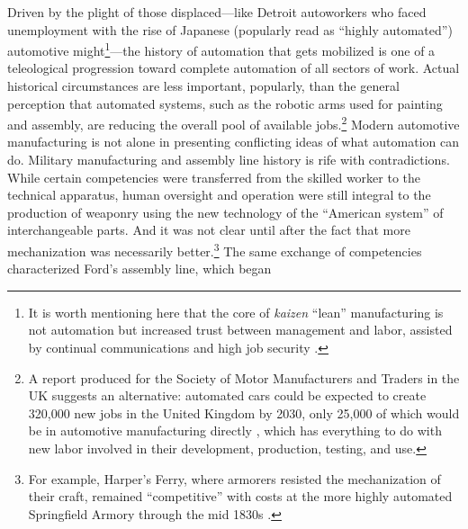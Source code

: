 


Driven by the plight of those displaced---like Detroit
autoworkers who faced unemployment with the rise of
Japanese (popularly read as ``highly automated'') automotive
might\footnote{It is worth mentioning here that the core of
  \emph{kaizen} ``lean'' manufacturing is not automation but increased trust between management
  and labor, assisted by continual communications and high job
  security \cite[p. 198--199]{nyeAmericas}.}---the history of
automation that gets mobilized is one of a teleological progression
toward complete automation of all sectors of work. Actual historical 
circumstances are less important, popularly, than the general
perception that automated 
systems, such as the robotic arms used for painting and assembly, are
reducing the overall pool of available jobs.\footnote{A report produced for the Society of Motor
Manufacturers and Traders in the UK suggests an alternative: automated
cars could be  
expected to create 320,000 new jobs in the United Kingdom by 2030, only 25,000 of
which would be in automotive manufacturing directly
\cite{toveyCreate}, which has everything to do with new labor involved in their
development, production, testing, and use.}
Modern automotive manufacturing is not alone in presenting conflicting ideas
of what automation can do. Military manufacturing and assembly line
history is rife with contradictions. While certain competencies were
transferred from the skilled worker
to the technical apparatus, human oversight and operation were still
integral to the production of weaponry using the new technology of the
``American system'' of interchangeable parts. And it was
not clear until after the fact that more mechanization was necessarily
better.\footnote{For example, Harper's Ferry, where armorers resisted the
  mechanization of their craft, remained ``competitive'' with
costs at the more highly automated Springfield Armory through the mid
1830s \cite[p. 324]{roesmithHarpers}.} The same exchange of
competencies characterized Ford's assembly line, which began
